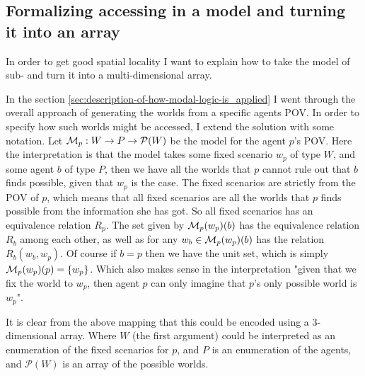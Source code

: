 \subsection{Formalizing accessing in a model and turning it into an array} \label{sec:model-access}
In order to get good spatial locality I want to explain how to take the model of sub-\SfiveN{} and turn it into a multi-dimensional array.

In the section \ref{sec:description-of-how-modal-logic-is_applied} I went through the overall approach of generating the worlds from a specific agents POV. 
In order to specify how such worlds might be accessed, I extend the solution with some notation. 
Let $\mathcal{M}_p: W \rightarrow P \rightarrow \mathcal{P}(W)$ be the model for the agent $p$'s POV. 
Here the interpretation is that the model takes some fixed scenario $w_p$ of type $W$, and some agent $b$ of type $P$, then we have all the worlds that $p$ cannot rule out that $b$ finds possible, given that $w_p$ is the case.  
The fixed scenarios are strictly from the POV of $p$, which means that all fixed scenarios are all the worlds that $p$ finds possible from the information she has got. 
So all fixed scenarios has an equivalence relation $R_p$. 
The set given by $\mathcal{M}_p(w_p)(b)$ has the equivalence relation $R_b$ among each other, as well as for any $w_b \in \mathcal{M}_p(w_p)(b)$ has the relation $R_b(w_b,w_p)$.
Of course if $b=p$ then we have the unit set, which is simply $\mathcal{M}_p(w_p)(p) = \{w_p\}$.
Which also makes sense in the interpretation "given that we fix the world to $w_p$, then agent $p$ can only imagine that $p$'s only possible world is $w_p$". 

It is clear from the above mapping that this could be encoded using a 3-dimensional array. 
Where $W$ (the first argument) could be interpreted as an enumeration of the fixed scenarios for $p$, and $P$ is an enumeration of the agents, and $\mathcal{P}(W)$ is an array of the possible worlds.


